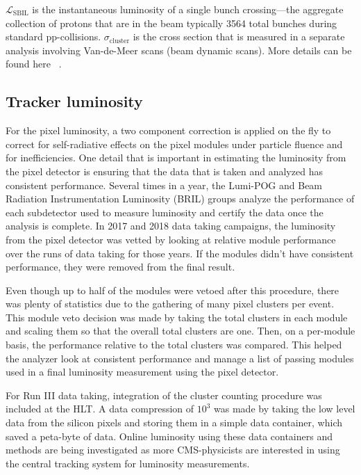 $\mathcal{L}_{\text{SBIL}}$ is the instantaneous luminosity of a single bunch crossing---the aggregate collection of protons that are in the beam typically 3564 total bunches during standard pp-collisions. $\sigma_{\text{cluster}}$ is the cross section that is measured in a separate analysis involving Van-de-Meer scans (beam dynamic scans). More details can be found here ~\cite{Knolle:2792593}. 


\subsection{Tracker luminosity}
For the pixel luminosity, a two component correction is applied on the fly to correct for self-radiative effects on the pixel modules under particle fluence and for inefficiencies.  
One detail that is important in estimating the luminosity from the pixel detector is ensuring that the data that is taken and analyzed has consistent performance. Several times in a year, the Lumi-POG and Beam Radiation Instrumentation Luminosity (BRIL) groups analyze the performance of each subdetector used to measure luminosity and certify the data once the analysis is complete. In 2017 and 2018 data taking campaigns, the luminosity from the pixel detector was vetted by looking at relative module performance over the runs of data taking for those years. If the modules didn't have consistent performance, they were removed from the final result. 

Even though up to half of the modules were vetoed after this procedure, there was plenty of statistics due to the gathering of many pixel clusters per event. 
This module veto decision was made by taking the total clusters in each module and scaling them so that the overall total clusters are one. Then, on a per-module basis, the performance relative to the total clusters was compared. This helped the analyzer look at consistent performance and manage a list of passing modules used in a final luminosity measurement using the pixel detector. 

For Run III data taking, integration of the cluster counting procedure was included at the HLT. A data compression of $10^3$ was made by taking the low level data from the silicon pixels and storing them in a simple data container, which saved a peta-byte of data. Online luminosity using these data containers and methods are being investigated as more CMS-physicists are interested in using the central tracking system for luminosity measurements.





